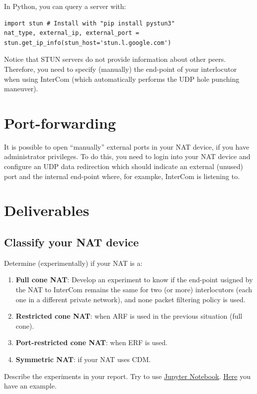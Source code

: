 In Python, you can query a server with:
\begin{verbatim}
import stun # Install with "pip install pystun3"
nat_type, external_ip, external_port = stun.get_ip_info(stun_host='stun.l.google.com')
\end{verbatim}

Notice that STUN servers do not provide information about other
peers. Therefore, you need to specify (manually) the end-point of your
interlocutor when using InterCom (which automatically performs the UDP
hole punching maneuver).

\section{Port-forwarding}

It is possible to open ``manually'' external ports in your NAT device,
if you have administrator privileges. To do this, you need to login
into your NAT device and configure an UDP data redirection which
should indicate an external (unused) port and the internal end-point
where, for exampke, InterCom is listening to.

\section{Deliverables}

\subsection*{Classify your NAT device}
Determine (experimentally) if your NAT is a:
\begin{enumerate}
\item \textbf{Full cone NAT}: Develop an experiment to know if the end-point
  usigned by the NAT to InterCom remains the same for two (or more)
  interlocutors (each one in a different private network), and none
  packet filtering policy is used.
\item \textbf{Restricted cone NAT}: when ARF is used in the previous situation (full cone).
\item \textbf{Port-restricted cone NAT}: when ERF is used.
\item \textbf{Symmetric NAT}: if your NAT uses CDM.
\end{enumerate}
Describe the experiments in your report. Try to use
\href{https://jupyter.org/}{Jupyter
  Notebook}. \href{https://github.com/Tecnologias-multimedia/InterCom/blob/master/docs/2-hours_seminar.ipynb}{Here}
you have an example.

